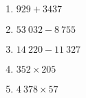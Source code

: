 


\begin{multicols}{2}
\begin{enumerate}[itemsep=1em]
	
	\item $929+3437$
	\item $53~032-8~755$
	\item $14~220-11~327$
	\item $352\times205$
	\item $4~378\times57$\\

\end{enumerate}
\end{multicols}